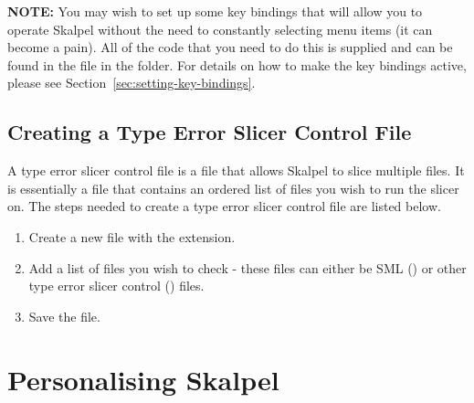 \documentclass{report}
\begin{document}
\textbf{NOTE:} You may wish to set up some key bindings that will
allow you to operate Skalpel without the need to
constantly selecting menu items (it can become a pain).  All of the
code that you need to do this is supplied and can be found in the
 file in the  folder.
For details on how to make the key bindings active, please see
Section~\ref{sec:setting-key-bindings}.


\subsection{Creating a Type Error Slicer Control File}
\label{sec:skalpel-control-files}

A type error slicer control file is a file that allows Skalpel to
slice multiple files. It is essentially a file that contains an
ordered list of files you wish to run the slicer on. The steps needed
to create a type error slicer control file are listed below.

\begin{enumerate}
\item Create a new file with the  extension.
\item Add a list of files you wish to check - these files can either
  be SML () or other type error slicer control
  () files.

\item Save the file.
\end{enumerate}


\newpage


\section{Personalising Skalpel}

\end{document}
